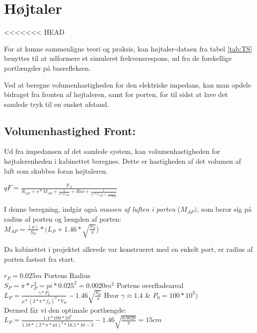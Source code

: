 \section{Højtaler}

<<<<<<< HEAD

For at kunne sammenligne teori og praksis, kan højtaler-dataen fra tabel \ref{tab:TS} benyttes til at udformere et simuleret frekvensrespons, ud fra de forskellige portlængder på basrefleksen. 

Ved at beregne volumenhastigheden for den elektriske impedans, kan man opdele bidraget fra fronten af højtaleren, samt for porten, for til sidst at lave det samlede tryk til en ønsket afstand. 


\subsection{Volumenhastighed Front:}
\label{sec:sim_calc}

Ud fra impedansen af det samlede system, kan volumenhastigheden for højtalerenheden i kabinettet beregnes. Dette er hastigheden af det volumen af luft som skubbes foran højtaleren. 

{\Large\(qF=\)}{\huge \(\frac{F_A}{R_{AE}+s*M_{AS}+\frac{1}{s*C_{AS}}+Ras+\frac{1}{(s*C_{AB}+\frac{1}{s*M_{AP}}}}\) }

I denne beregning, indgår også \textit{massen af luften i porten} ($M_{AP})$, som beror sig på radius af porten og længden af porten:\\

\(M_{AP}=\frac{(\rho)}{S_P}*(L_P+1.46*\sqrt{\frac{S_P}{\pi}}\))

Da kabinettet i projektet allerede var konstrueret med en enkelt port, er radius af porten fastsat fra start.

\(r_P=0.025 m\)		\hspace{6.2cm} Portens Radius\\
\(S_P=\pi*r_P^2=pi*0.025^2=0.0020 m^2\)		\hspace{2cm} Portens overfladeareal\\

\(L_P=\frac{\gamma*P_0}{\rho*(2*\pi*f_p)^2*V_{B}}-1.46\sqrt{\frac{S_P}{\pi}}\)			\hspace{3cm} Hvor $\gamma \approx 1.4$ \& $P_0=100*10^3)$\\

Dermed får vi den optimale portlængde:\\

\(L_P=\frac{1.4*100*10^3}{1.18*(2*\pi*44)^2*16.5*10-3}-1.46\sqrt{\frac{0.0020}{\pi}}=15cm\)


